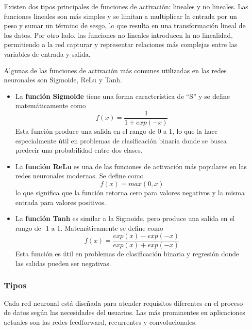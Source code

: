 Existen dos tipos principales de funciones de activación: lineales y no lineales. Las funciones lineales son más simples y se limitan a multiplicar la entrada por un peso y sumar un término de sesgo, lo que resulta en una transformación lineal de los datos. Por otro lado, las funciones no lineales introducen la no linealidad, permitiendo a la red capturar y representar relaciones más complejas entre las variables de entrada y salida.

Algunas de las funciones de activación más comunes utilizadas en las redes neuronales son Sigmoide, ReLu y Tanh.

\begin{itemize}
    \item La \textbf{función Sigmoide} tiene una forma característica de ``S'' y se define matemáticamente como \begin{equation}
        f(x) = \frac{1}{1 + exp(-x)}
    \end{equation} Esta función produce una salida en el rango de 0 a 1, lo que la hace especialmente útil en problemas de clasificación binaria donde se busca predecir una probabilidad entre dos clases.
    \item La \textbf{función ReLu} es una de las funciones de activación más populares en las redes neuronales modernas. Se define como \begin{equation}
        f(x) = max(0, x)
    \end{equation} lo que significa que la función retorna cero para valores negativos y la misma entrada para valores positivos.
    \item La \textbf{función Tanh} es similar a la Sigmoide, pero produce una salida en el rango de -1 a 1. Matemáticamente se define como \begin{equation}
        f(x) = \frac{exp(x) - exp(-x)}{exp(x) + exp(-x)}
    \end{equation} Esta función es útil en problemas de clasificación binaria y regresión donde las salidas pueden ser negativas.
\end{itemize}

\subsubsection{Tipos}
Cada red neuronal está diseñada para atender requisitos diferentes en el proceso de datos según las necesidades del usuarios. Las más prominentes en aplicaciones actuales son las redes feedforward, recurrentes y convolucionales. 

